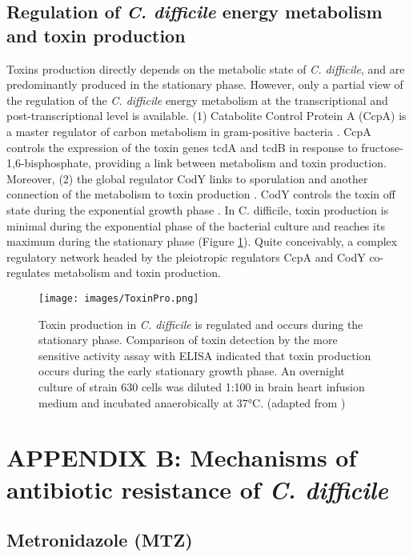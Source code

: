 \documentclass{article}
\begin{document}
\subsection{Regulation of {\it C. difficile} energy metabolism and toxin production}

Toxins production directly depends on the metabolic state of {\it C. difficile}, and are predominantly produced in the stationary phase. However, only a partial view of the regulation of the {\it C. difficile} energy metabolism at the transcriptional and post-transcriptional level is available. (1) Catabolite Control Protein A (CcpA) is a master regulator of carbon metabolism in gram-positive bacteria \cite{Neumann}. CcpA controls the expression of the toxin genes tcdA and tcdB in response to fructose-1,6-bisphosphate, providing a link between metabolism and toxin production. Moreover, (2) the global regulator CodY links to sporulation and another connection of the metabolism to toxin production \cite{Ransom}. CodY controls the toxin off state during the exponential growth phase \cite{Girinathan}. In C. difficile, toxin production is minimal during the exponential phase of the bacterial culture and reaches its maximum during the stationary phase \cite{Darkoh} (Figure \ref{fig:txnPro}). Quite conceivably, a complex regulatory network headed by the pleiotropic regulators CcpA and CodY co-regulates metabolism and toxin production.

\begin{figure}
\centering
\texttt{[image: images/ToxinPro.png]}
\caption{\label{fig:txnPro} Toxin production in {\it C. difficile} is regulated and occurs during the stationary phase. Comparison of toxin detection by the more sensitive activity assay with ELISA indicated that toxin production occurs during the early stationary growth phase. An overnight culture of strain 630 cells was diluted 1:100 in brain heart infusion medium and incubated anaerobically at 37°C. (adapted from \cite{Darkoh})}
\end{figure}

\section{APPENDIX B: Mechanisms of antibiotic resistance of {\it C. difficile}}

\subsection{Metronidazole (MTZ)}
\end{document}
